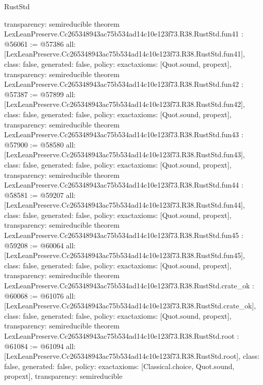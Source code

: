 \begin{lexlean}{RustStd}
\begin{coremodule}
{  transparency: semireducible
}
theorem LexLeanPreserve.Cc265348943ac75b534ad14c10e123f73.R38.RustStd.fun41 : @56061 := @57386 {
  all: [LexLeanPreserve.Cc265348943ac75b534ad14c10e123f73.R38.RustStd.fun41],
  class: false,
  generated: false,
  policy: exact{axioms: [Quot.sound, propext]},
  transparency: semireducible
}
theorem LexLeanPreserve.Cc265348943ac75b534ad14c10e123f73.R38.RustStd.fun42 : @57387 := @57899 {
  all: [LexLeanPreserve.Cc265348943ac75b534ad14c10e123f73.R38.RustStd.fun42],
  class: false,
  generated: false,
  policy: exact{axioms: [Quot.sound, propext]},
  transparency: semireducible
}
theorem LexLeanPreserve.Cc265348943ac75b534ad14c10e123f73.R38.RustStd.fun43 : @57900 := @58580 {
  all: [LexLeanPreserve.Cc265348943ac75b534ad14c10e123f73.R38.RustStd.fun43],
  class: false,
  generated: false,
  policy: exact{axioms: [Quot.sound, propext]},
  transparency: semireducible
}
theorem LexLeanPreserve.Cc265348943ac75b534ad14c10e123f73.R38.RustStd.fun44 : @58581 := @59207 {
  all: [LexLeanPreserve.Cc265348943ac75b534ad14c10e123f73.R38.RustStd.fun44],
  class: false,
  generated: false,
  policy: exact{axioms: [Quot.sound, propext]},
  transparency: semireducible
}
theorem LexLeanPreserve.Cc265348943ac75b534ad14c10e123f73.R38.RustStd.fun45 : @59208 := @60064 {
  all: [LexLeanPreserve.Cc265348943ac75b534ad14c10e123f73.R38.RustStd.fun45],
  class: false,
  generated: false,
  policy: exact{axioms: [Quot.sound, propext]},
  transparency: semireducible
}
theorem LexLeanPreserve.Cc265348943ac75b534ad14c10e123f73.R38.RustStd.crate_ok : @60068 := @61076 {
  all: [LexLeanPreserve.Cc265348943ac75b534ad14c10e123f73.R38.RustStd.crate_ok],
  class: false,
  generated: false,
  policy: exact{axioms: [Quot.sound, propext]},
  transparency: semireducible
}
theorem LexLeanPreserve.Cc265348943ac75b534ad14c10e123f73.R38.RustStd.root : @61084 := @61094 {
  all: [LexLeanPreserve.Cc265348943ac75b534ad14c10e123f73.R38.RustStd.root],
  class: false,
  generated: false,
  policy: exact{axioms: [Classical.choice, Quot.sound, propext]},
  transparency: semireducible
}


\end{coremodule}
\end{lexlean}
